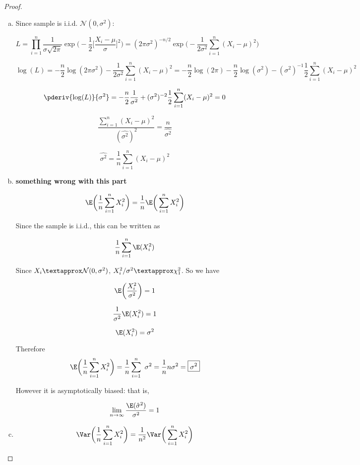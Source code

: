 \begin{proof}

\begin{enumerate}[a.]

\item Since sample is i.i.d. \(\mathcal{N}(0, \sigma^2) \):

\[
L = \prod_{i=1}^n \frac{1}{\sigma \sqrt{2 \pi}} \exp\bigg(- \frac{1}{2} \bigg[\frac{X_i - \mu}{\sigma}\bigg]^2 \bigg) = (2 \pi\sigma^2)^{-n/2} \exp\bigg(- \frac{1}{2 \sigma^2} \sum_{i=1}^n (X_i - \mu)^2 \bigg)
\]

\[
\log(L) = -\frac{n}{2} \log(2 \pi\sigma^2) - \frac{1}{2 \sigma^2} \sum_{i=1}^n (X_i - \mu)^2 =  -\frac{n}{2} \log(2 \pi) - \frac{n}{2} \log(\sigma^2) - (\sigma^2)^{-1} \frac{1}{2} \sum_{i=1}^n (X_i - \mu)^2
\]

\[
\pderiv{\log(L)}{\sigma^2} = -\frac{n}{2} \frac{1}{\sigma^2} +   ({\sigma^2})^{-2} \frac{1}{2}  \sum_{i=1}^n (X_i - \mu)^2 = 0
\]

\[
\frac{\sum_{i=1}^n (X_i - \mu)^2}{(\hat{\sigma^2})^2}  = \frac{n}{\hat{\sigma^2}}
\]

\[
\hat{\sigma^2} = \frac{1}{n} \sum_{i=1}^n (X_i - \mu)^2
\]


\item \textbf{something wrong with this part}

\[
\E \bigg(  \frac{1}{n} \sum_{i=1}^n X_i^2 \bigg) = \frac{1}{n} \E \bigg(  \sum_{i=1}^n X_i^2 \bigg)
\]

Since the sample is i.i.d., this can be written as 

\[
 \frac{1}{n}   \sum_{i=1}^n \E (X_i^2)
\]

Since \(X_i \textapprox \mathcal{N}(0, \sigma^2) \), \(X_i^2/\sigma^2 \textapprox \chi_1^2\). So we have

\[
\E\bigg( \frac{X_i^2}{\sigma^2} \bigg) = 1
\]

\[
\frac{1}{\sigma^2} \E( X_i^2) = 1
\]

\[
\E( X_i^2) = \sigma^2
\]

Therefore
\[
\E \bigg(  \frac{1}{n} \sum_{i=1}^n X_i^2 \bigg) = \frac{1}{n}   \sum_{i=1}^n \ \sigma^2 = \frac{1}{n} n \sigma^2 = \boxed{\sigma^2}
\]

However it is asymptotically biased: that is,

\[
\lim_{n \to \infty} \frac{\E( \hat{\sigma}^2)}{\sigma^2} = 1
\]


\item

\[
\Var \bigg( \frac{1}{n} \sum_{i=1}^n X_i^2 \bigg) = \frac{1}{n^2} \Var \bigg( \sum_{i=1}^n X_i^2 \bigg)
\]


\end{enumerate}
\end{proof}
